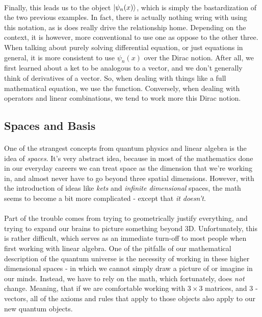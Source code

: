 \documentclass[12pt,letterpaper]{book}
\begin{document}
\paragraph*{}Finally, this leads us to the object $\ket{\psi_n(x)}$, which is simply the bastardization of the two previous examples. In fact, there is actually nothing wring with using this notation, as is does really drive the relationship home. Depending on the context, it is however, more conventional to use one as oppose to the other three. When talking about purely solving differential equation, or just equations in general, it is more consistent to use $\psi_n(x)$ over the Dirac notion. After all, we first learned about a ket to be analogous to a vector, and we don't generally think of derivatives of a vector. So, when dealing with things like a full mathematical equation, we use the function. Conversely, when dealing with operators and linear combinations, we tend to work more this Dirac notion.


\subsection*{Spaces and Basis}
\paragraph*{}One of the strangest concepts from quantum physics and linear algebra is the idea of \textit{spaces}. It's very abstract idea, because in most of the mathematics done in our everyday careers we can treat space as the dimension that we're working in, and almost never have to go beyond three spatial dimensions. However, with the introduction of ideas like \textit{kets} and \textit{infinite dimensional} spaces, the math seems to become a bit more complicated - except that \textit{it doesn't}.
\paragraph*{}Part of the trouble comes from trying to geometrically justify everything, and trying to expand our brains to picture something beyond 3D. Unfortunately, this is rather difficult, which serves as an immediate turn-off to most people when first working with linear algebra. One of the pitfalls of our mathematical description of the quantum universe is the necessity of working in these higher dimensional spaces - in which we cannot simply draw a picture of or imagine in our minds. Instead, we have to rely on the math, which fortunately, does \textit{not} change. Meaning, that if we are comfortable working with $3 \times 3$ matrices, and 3 -vectors, all of the axioms and rules that apply to those objects also apply to our new quantum objects.
\end{document}
